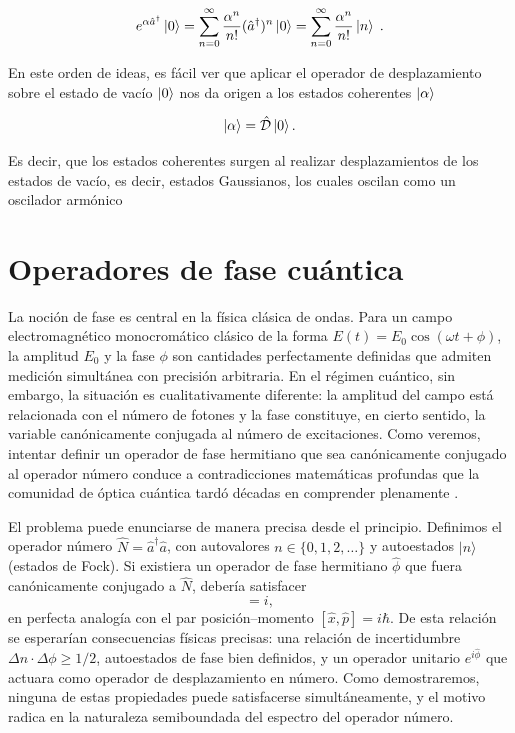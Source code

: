             \begin{equation}
                e^{\alpha\hat{a}^{\dagger}}\ket{0} = \sum_{n=0}^{\infty}\frac{\alpha^n}{n!}(\hat{a}^{\dagger})^n\ket{0} = \sum_{n=0}^{\infty}\frac{\alpha^n}{n!}\ket{n}\;.
            \end{equation}

            En este orden de ideas, es fácil ver que aplicar el operador de desplazamiento sobre el estado de vacío $\ket{0}$ nos da origen a los estados coherentes $\ket{\alpha}$

            \begin{equation}
                \ket{\alpha} = \hat{\mathcal{D}}\ket{0}.
            \end{equation}

            Es decir, que los estados coherentes surgen al realizar desplazamientos de los estados de vacío, es decir, estados Gaussianos, los cuales oscilan como un oscilador armónico

    \section{Operadores de fase cuántica}
        La noción de fase es central en la física clásica de ondas. Para un campo electromagnético monocromático clásico de la forma $E(t) = E_0 \cos(\omega t + \phi)$, la amplitud $E_0$ y la fase $\phi$ son cantidades perfectamente definidas que admiten medición simultánea con precisión arbitraria. En el régimen cuántico, sin embargo, la situación es cualitativamente diferente: la amplitud del campo está relacionada con el número de fotones y la fase constituye, en cierto sentido, la variable canónicamente conjugada al número de excitaciones. Como veremos, intentar definir un operador de fase hermitiano que sea canónicamente conjugado al operador número conduce a contradicciones matemáticas profundas que la comunidad de óptica cuántica tardó décadas en comprender plenamente \cite{Barnett1989,Lynch1995,Perinova1998}.
    
        El problema puede enunciarse de manera precisa desde el principio. Definimos el operador número $\hat{N} = \hat{a}^{\dagger}\hat{a}$, con autovalores $n \in \{0, 1, 2, \ldots\}$ y autoestados $|n\rangle$ (estados de Fock). Si existiera un operador de fase hermitiano $\hat{\phi}$ que fuera canónicamente conjugado a $\hat{N}$, debería satisfacer
        \begin{equation}
            [\hat{N}, \hat{\phi}] = i,
            \label{eq:conmutador_n_phi}
        \end{equation}
        en perfecta analogía con el par posición--momento $[\hat{x}, \hat{p}] = i\hbar$. De esta relación se esperarían consecuencias físicas precisas: una relación de incertidumbre $\Delta n \cdot \Delta\phi \geq 1/2$, autoestados de fase bien definidos, y un operador unitario $e^{i\hat{\phi}}$ que actuara como operador de desplazamiento en número. Como demostraremos, ninguna de estas propiedades puede satisfacerse simultáneamente, y el motivo radica en la naturaleza semiboundada del espectro del operador número.
        
